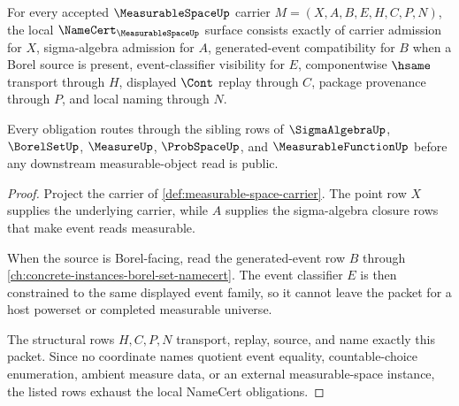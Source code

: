 \begin{theorem}
\label{thm:measurable-space-namecert-obligations}
For every accepted $\MeasurableSpaceUp$ carrier $M=(X,A,B,E,H,C,P,N)$, the local $\NameCert_{\MeasurableSpaceUp}$ surface consists exactly of carrier admission for $X$, sigma-algebra admission for $A$, generated-event compatibility for $B$ when a Borel source is present, event-classifier visibility for $E$, componentwise $\hsame$ transport through $H$, displayed $\Cont$ replay through $C$, package provenance through $P$, and local naming through $N$.

Every obligation routes through the sibling rows of $\SigmaAlgebraUp$, $\BorelSetUp$, $\MeasureUp$, $\ProbSpaceUp$, and $\MeasurableFunctionUp$ before any downstream measurable-object read is public.
\end{theorem}
\begin{proof}
Project the carrier of \autoref{def:measurable-space-carrier}. The point row $X$ supplies the underlying carrier, while $A$ supplies the sigma-algebra closure rows that make event reads measurable.

When the source is Borel-facing, read the generated-event row $B$ through \autoref{ch:concrete-instances-borel-set-namecert}. The event classifier $E$ is then constrained to the same displayed event family, so it cannot leave the packet for a host powerset or completed measurable universe.

The structural rows $H,C,P,N$ transport, replay, source, and name exactly this packet. Since no coordinate names quotient event equality, countable-choice enumeration, ambient measure data, or an external measurable-space instance, the listed rows exhaust the local NameCert obligations.
\end{proof}

